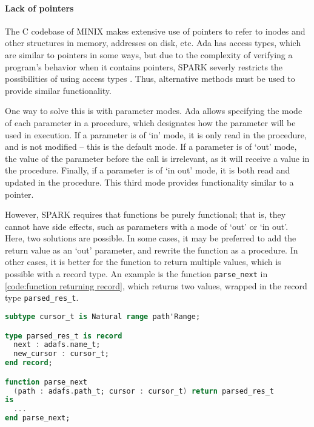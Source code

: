 \paragraph{Lack of pointers}
The C codebase of MINIX makes extensive use of pointers to refer to inodes and other structures in memory, addresses on disk, etc.
Ada has access types, which are similar to pointers in some ways, but due to the complexity of verifying a program's behavior when it contains pointers, SPARK severly restricts the possibilities of using access types \cite{sparkRM}.
Thus, alternative methods must be used to provide similar functionality.

One way to solve this is with parameter modes.
Ada allows specifying the mode of each parameter in a procedure, which designates how the parameter will be used in execution.
If a parameter is of `in' mode, it is only read in the procedure, and is not modified -- this is the default mode.
If a parameter is of `out' mode, the value of the parameter before the call is irrelevant, as it will receive a value in the procedure.
Finally, if a parameter is of `in out' mode, it is both read and updated in the procedure.
This third mode provides functionality similar to a pointer.

However, SPARK requires that functions be purely functional; that is, they cannot have side effects, such as parameters with a mode of `out' or `in out'.
Here, two solutions are possible.
In some cases, it may be preferred to add the return value as an `out' parameter, and rewrite the function as a procedure.
In other cases, it is better for the function to return multiple values, which is possible with a record type.
An example is the function \lstinline[language=Ada]{parse_next} in \autoref{code:function returning record}, which returns two values, wrapped in the record type \lstinline[language=Ada]{parsed_res_t}.

\begin{lstlisting}[caption={Parse function returning the parsed component and the new cursor position (ellipses denote code omitted for brevity)}, label={code:function returning record}, language=Ada]
subtype cursor_t is Natural range path'Range;

type parsed_res_t is record
  next : adafs.name_t;
  new_cursor : cursor_t;
end record;

function parse_next
  (path : adafs.path_t; cursor : cursor_t) return parsed_res_t
is
  ...
end parse_next;
\end{lstlisting}

